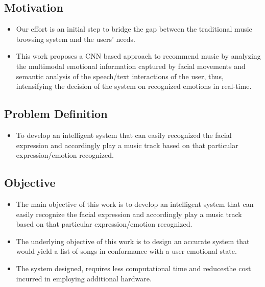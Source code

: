 \documentclass[12pt]{report}
\begin{document}
\clearpage

\raggedright
\subsection{ Motivation}

\justifying
\setlength{\parindent}{4em}
\setlength{\parskip}{0.5em}
\renewcommand{\baselinestretch}{1.5}
\normalsize\hspace{1.7cm}\begin{itemize} \item Our effort is an initial step to bridge the gap between the traditional music browsing
system and the users’ needs.

\item This work proposes a CNN based approach to recommend music by analyzing the 
multimodal emotional information captured by facial movements and semantic analysis 
of the speech/text interactions of the user, thus, intensifying the decision of the system on 
recognized emotions in real-time.\\
\end{itemize}
\raggedright
\subsection{Problem Definition}

\justifying
\setlength{\parindent}{4em}
\setlength{\parskip}{0.5em}
\renewcommand{\baselinestretch}{1.5}
\normalsize \hspace{1.7cm}\begin{itemize}\item To develop an intelligent system that can easily recognized the facial expression and 
accordingly play a music track based on that particular expression/emotion recognized.

\end{itemize}
\raggedright
\subsection{Objective}

\justifying
\setlength{\parindent}{4em}
\setlength{\parskip}{0.5em}
\renewcommand{\baselinestretch}{1.5}
\normalsize \hspace{1.7cm}\begin{itemize}\item The main objective of this work is to develop an intelligent system that can easily 
recognize the facial expression and accordingly play a music track based on that particular
expression/emotion recognized.

\item  The underlying objective of this work is to design an accurate system that would yield a 
list of songs in conformance with a user emotional state.

\item   The system designed, requires less computational time and reducesthe cost incurred in 
employing additional hardware.


\end{itemize}
\end{document}
